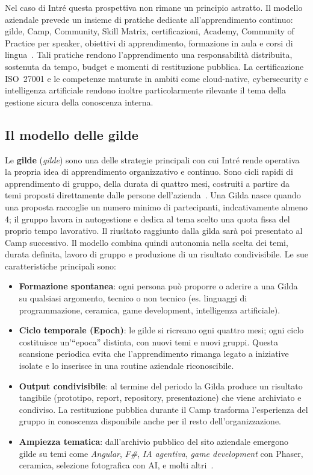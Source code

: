 Nel caso di Intré questa prospettiva non rimane un principio astratto. Il
modello aziendale prevede un insieme di pratiche dedicate all'apprendimento
continuo: gilde, Camp, Community, Skill Matrix, certificazioni, Academy,
Community of Practice per speaker, obiettivi di apprendimento, formazione in
aula e corsi di lingua~\cite{intre_learning_organization}. Tali pratiche
rendono l'apprendimento una responsabilità distribuita, sostenuta da tempo,
budget e momenti di restituzione pubblica. La certificazione ISO~27001 e le
competenze maturate in ambiti come cloud-native, cybersecurity e intelligenza
artificiale rendono inoltre particolarmente rilevante il tema della gestione
sicura della conoscenza interna.

\subsection{Il modello delle gilde}
\label{subsec:guild_model}
Le \textbf{gilde} (\emph{gilde}) sono una delle strategie principali con cui
Intré rende operativa la propria idea di apprendimento organizzativo e continuo. Sono cicli
rapidi di apprendimento di gruppo, della durata di quattro mesi, costruiti a
partire da temi proposti direttamente dalle persone
dell'azienda~\cite{intre_learning_organization,intre_gilde}. Una Gilda nasce quando una
proposta raccoglie un numero minimo di partecipanti, indcativamente almeno 4; il gruppo lavora in
autogestione e dedica al tema scelto una quota fissa del proprio tempo
lavorativo. Il riusltato raggiunto dalla gilda sarà poi presentato al Camp successivo. Il modello combina quindi
autonomia nella scelta dei temi, durata definita, lavoro di gruppo e produzione
di un risultato condivisibile. Le sue caratteristiche principali sono:

\begin{itemize}
  \item \textbf{Formazione spontanea}: ogni persona può proporre o aderire a
    una Gilda su qualsiasi argomento, tecnico o non tecnico (es. linguaggi
    di programmazione, ceramica, game development, intelligenza artificiale).
  \item \textbf{Ciclo temporale (Epoch)}: le gilde si ricreano ogni quattro
    mesi; ogni ciclo costituisce un'``epoca'' distinta, con nuovi temi e nuovi
    gruppi. Questa scansione periodica evita che l'apprendimento rimanga legato
    a iniziative isolate e lo inserisce in una routine aziendale riconoscibile.
  \item \textbf{Output condivisibile}: al termine del periodo la Gilda produce
    un risultato tangibile (prototipo, report, repository, presentazione) che
    viene archiviato e condiviso. La restituzione pubblica durante il Camp
    trasforma l'esperienza del gruppo in conoscenza disponibile anche per il
    resto dell'organizzazione.
  \item \textbf{Ampiezza tematica}: dall'archivio pubblico del sito aziendale
    emergono gilde su temi come \emph{Angular}, \emph{F\#}, \emph{IA agentiva},
    \emph{game development} con Phaser, ceramica, selezione fotografica con AI,
    e molti altri~\cite{intre_gilde}.
\end{itemize}

